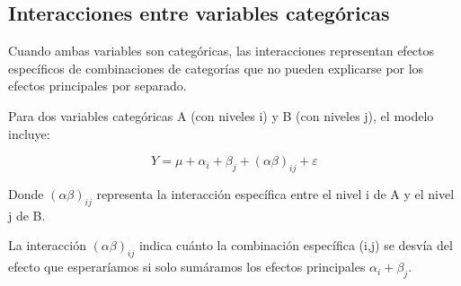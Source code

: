 \documentclass[
  letterpaper,
  DIV=11,
  numbers=noendperiod]{scrreprt}
\begin{document}
\subsection{Interacciones entre variables
categóricas}\label{interacciones-entre-variables-categuxf3ricas}

Cuando ambas variables son categóricas, las interacciones representan
efectos específicos de combinaciones de categorías que no pueden
explicarse por los efectos principales por separado.

Para dos variables categóricas A (con niveles i) y B (con niveles j), el
modelo incluye:

\[Y = \mu + \alpha_i + \beta_j + (\alpha\beta)_{ij} + \varepsilon\]

Donde \((\alpha\beta)_{ij}\) representa la interacción específica entre
el nivel i de A y el nivel j de B.

La interacción \((\alpha\beta)_{ij}\) indica cuánto la combinación
específica (i,j) se desvía del efecto que esperaríamos si solo sumáramos
los efectos principales \(\alpha_i + \beta_j\).
\end{document}

